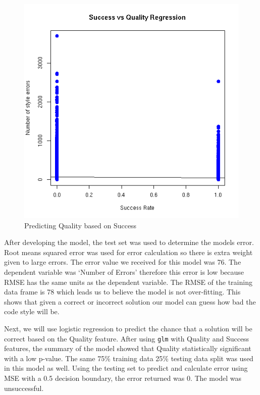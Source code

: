 \documentclass{article}
\begin{document}
\begin{figure}[ht] \vskip 0.2in \begin{center}
\centerline{\includegraphics[width=\columnwidth]{../images/linearregression.png}}
\caption{ Predicting Quality based on Success } \label{linearRegression} \end{center} \vskip -0.2in \end{figure}

After developing the model, the test set was used to determine the
models error. Root means squared error was used for error calculation so
there is extra weight given to large errors. The error value we received
for this model was 76. The dependent variable was `Number of Errors'
therefore this error is low because RMSE has the same units as the
dependent variable. The RMSE of the training data frame is 78 which
leads us to believe the model is not over-fitting. This shows that given
a correct or incorrect solution our model can guess how bad the code
style will be.

Next, we will use logistic regression to predict the chance that a
solution will be correct based on the Quality feature. After using
\texttt{glm} with Quality and Success features, the summary of the model
showed that Quality statistically significant with a low p-value. The
same 75\% training data 25\% testing data split was used in this model
as well. Using the testing set to predict and calculate error using MSE
with a 0.5 decision boundary, the error returned was 0. The model was
unsuccessful.
\end{document}
